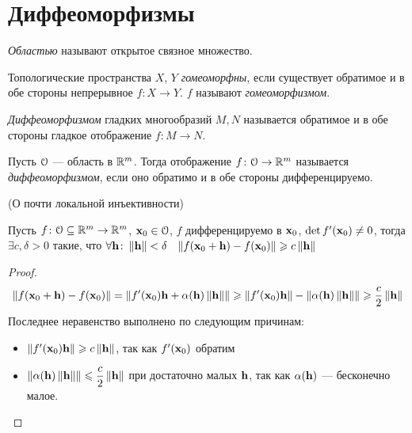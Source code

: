 \section{Диффеоморфизмы}

\begin{definition}
    \textit{Областью} называют открытое связное множество.
\end{definition}

\begin{definition}
    Топологические пространства $X$, $Y$ \textit{гомеоморфны}, если
    существует обратимое и в обе стороны непрерывное $f \colon X \to Y$.
    $f$ называют \textit{гомеоморфизмом}.
\end{definition}

\begin{definition}
    \textit{Диффеоморфизмом} гладких многообразий $M, N$ называется
    обратимое и в обе стороны гладкое отображение $f \colon M \to N$.
\end{definition}

\begin{definition}
    Пусть $\mathcal{O}$ --- область в $\mathbb{R}^m$. Тогда отображение $f \colon
    \mathcal{O} \to \mathbb{R}^m$ называется \textit{диффеоморфизмом}, если оно обратимо
    и в обе стороны дифференцируемо.
\end{definition}

\begin{lemma}(О почти локальной инъективности)

    Пусть $f \colon \mathcal{O} \subseteq \mathbb{R}^m \to \mathbb{R}^m$, $\mathbf{x}_0 \in \mathcal{O}$, $f$
    дифференцируемо в $\mathbf{x}_0$, $\det{f'(\mathbf{x}_0)} \neq 0$, тогда \\ $\exists c, \delta
    > 0$ такие, что $\forall \mathbf{h} \colon \left\lVert\mathbf{h}\right\rVert < \delta$~
$
    \left\lVert f(\mathbf{x}_0 + \mathbf{h}) - f(\mathbf{x}_0)\right\rVert \geqslant c \left\lVert\mathbf{h}\right\rVert
$
\end{lemma}
\begin{proof}
\[
    \left\lVert f(\mathbf{x}_0 + \mathbf{h}) - f(\mathbf{x}_0)\right\rVert = \left\lVert f'(\mathbf{x}_0)\mathbf{h} + \alpha(\mathbf{h})\left\lVert\mathbf{h}\right\rVert\right\rVert
    \geqslant \left\lVert f'(\mathbf{x}_0)\mathbf{h}\right\rVert - \left\lVert\alpha(\mathbf{h})\left\lVert\mathbf{h}\right\rVert\right\rVert \geqslant \frac{c}{2}
    \left\lVert\mathbf{h}\right\rVert
\]
    Последнее неравенство выполнено по следующим причинам:
    \begin{itemize}
        \item $\left\lVert f'(\mathbf{x}_0)\mathbf{h}\right\rVert \geqslant c \left\lVert\mathbf{h}\right\rVert$, так как $f'(\mathbf{x}_0)$ обратим
        \item $\displaystyle \left\lVert\alpha(\mathbf{h})\left\lVert\mathbf{h}\right\rVert\right\rVert \leqslant \frac{c}{2}
        \left\lVert\mathbf{h}\right\rVert$ при достаточно малых $\mathbf{h}$, так как $\alpha(\mathbf{h})$ --- бесконечно малое.
    \end{itemize}
\end{proof}

